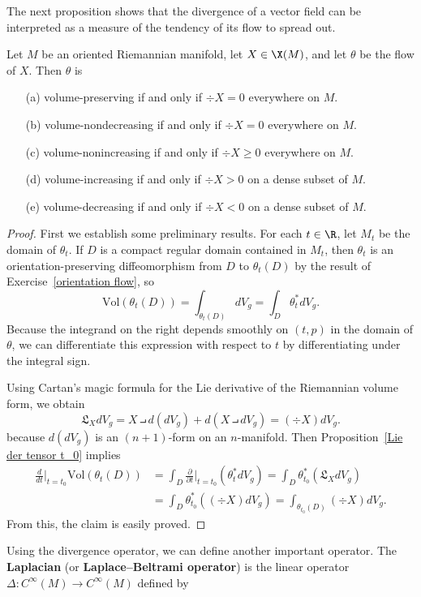 The next proposition shows that the divergence of a vector field can be interpreted as a measure of the tendency of its flow to spread out.
\begin{proposition}\label{divergence geometric interpretation}
Let $M$ be an oriented Riemannian manifold, let $X\in\X(M)$, and let $\theta$ be the flow of $X$. Then $\theta$ is
\begin{itemize}
\item[(a)] volume-preserving if and only if $\div X=0$ everywhere on $M$.
\item[(b)] volume-nondecreasing if and only if $\div X=0$ everywhere on $M$.
\item[(c)] volume-nonincreasing if and only if $\div X\geq0$ everywhere on $M$.
\item[(d)] volume-increasing if and only if $\div X>0$ on a dense subset of $M$.
\item[(e)] volume-decreasing if and only if $\div X<0$ on a dense subset of $M$.
\end{itemize}
\end{proposition}
\begin{proof}
First we establish some preliminary results. For each $t\in\R$, let $M_t$ be the domain of $\theta_t$. If $D$ is a compact regular domain contained in $M_t$, then $\theta_t$ is an orientation-preserving diffeomorphism from $D$ to $\theta_t(D)$ by the result of Exercise~\ref{orientation flow}, so
\[\mathrm{Vol}(\theta_t(D))=\int_{\theta_t(D)}dV_g=\int_D\theta_t^*dV_g.\]
Because the integrand on the right depends smoothly on $(t,p)$ in the domain of $\theta$, we can differentiate this expression with respect to $t$ by differentiating under the integral sign.\par
Using Cartan's magic formula for the Lie derivative of the Riemannian volume form, we obtain
\[\mathfrak{L}_XdV_g=X\intprod d(dV_g)+d(X\intprod dV_g)=(\div X)dV_g.\]
because $d(dV_g)$ is an $(n+1)$-form on an $n$-manifold. Then Proposition~\ref{Lie der tensor t_0} implies
\begin{align*}
\frac{d}{dt}\Big|_{t=t_0}\mathrm{Vol}(\theta_t(D))&=\int_{D}\frac{\partial}{\partial t}\Big|_{t=t_0}(\theta_t^*dV_g)=\int_D\theta_{t_0}^*(\mathfrak{L}_XdV_g)\\
&=\int_D\theta_{t_0}^*((\div X)dV_g)=\int_{\theta_{t_0}(D)}(\div X)dV_g.
\end{align*}
From this, the claim is easily proved.
\end{proof}
Using the divergence operator, we can define another important operator. The \textbf{Laplacian} (or \textbf{Laplace–Beltrami operator}) is the linear operator $\Delta:C^{\infty}(M)\to C^{\infty}(M)$ defined by
